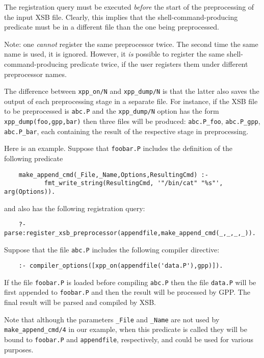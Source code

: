 \begin{description}
\begin{itemize}
    The registration query must be executed \emph{before} the start of the
    preprocessing of the input XSB file. Clearly, this implies that the
    shell-command-producing predicate must be in a different file than the
    one being preprocessed.

    Note: one \emph{cannot} register the same preprocessor twice. The
    second time the same name is used, it is ignored. However, it \emph{is}
    possible to register the same shell-command-producing predicate twice,
    if the user registers them under different preprocessor names.
  \end{itemize}

  The difference between {\tt xpp\_on/N} and {\tt xpp\_dump/N}  
  is that the latter also saves the output of each preprocessing stage in a
  separate file. For instance, if the XSB file to be preprocessed
  is {\tt abc.P} and the {\tt xpp\_dump/N} option has the form
  {\tt xpp\_dump(foo,gpp,bar)} then three files will be produced:
  {\tt abc.P\_foo}, {\tt abc.P\_gpp}, {\tt abc.P\_bar}, each containing the
  result of the respective stage in preprocessing.   

  Here is an example. Suppose that {\tt foobar.P} includes the definition of
  the following predicate
\begin{verbatim}
    make_append_cmd(_File,_Name,Options,ResultingCmd) :-
           fmt_write_string(ResultingCmd, '"/bin/cat" "%s"', arg(Options)).
\end{verbatim}
  and also has the following registration query:
\begin{verbatim}
    ?- parse:register_xsb_preprocessor(appendfile,make_append_cmd(_,_,_,_)).  
\end{verbatim}
  Suppose that the file {\tt abc.P} includes the following compiler directive:
\begin{verbatim}
    :- compiler_options([xpp_on(appendfile('data.P'),gpp)]).  
\end{verbatim}
  If the file {\tt foobar.P} is loaded before compiling {\tt abc.P} then  
  the file {\tt data.P} will be first appended to {\tt foobar.P} and then
  the result will be processed by GPP. The final result will be parsed and
  compiled by XSB.

  Note that although the parameters {\tt \_File} and {\tt \_Name} are not
  used by {\tt make\_append\_cmd/4} in our example, when this predicate is
  called they will be bound to {\tt foobar.P} and {\tt appendfile},
  respectively, and could be used for various purposes.






\end{description}
